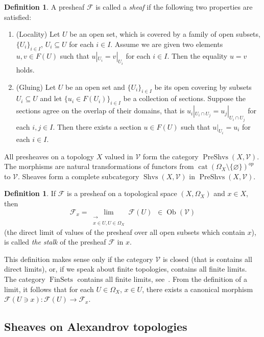 \documentclass[english,12pt,oneside]{amsproc}
\DeclareMathOperator{\cat}{cat}
\DeclareMathOperator{\FinSets}{FinSets}
\DeclareMathOperator{\PreShvs}{PreShvs}
\DeclareMathOperator{\Shvs}{Shvs}
\DeclareMathOperator{\Ob}{Ob}
\newcommand{\ca}[1]{\mathcal{#1}}
\newcommand{\Vv}{\mathcal{V}}
\newcounter{stmcounter}[section]
\numberwithin{equation}{section}
\theoremstyle{plain}
\theoremstyle{definition}
\newtheorem{defin}[stmcounter]{Definition}
\theoremstyle{remark}
\begin{document}
\begin{defin}\label{definSheaf}
A presheaf $\ca{F}$ is called a \emph{sheaf} if the following two properties are satisfied:
\begin{enumerate}
  \item (Locality) Let $U$ be an open set, which is covered by a family of open subsets, $\{U_{i}\}_{i\in I}$, $U_{i}\subseteq U$ for each $i\in I$. Assume we are given two elements $u,v\in F(U)$ such that $u|_{U_{i}}=v|_{U_{i}}$ for each $i\in I$. Then the equality $u=v$ holds.
  \item (Gluing) Let $U$ be an open set  and  $\{U_{i}\}_{i\in I}$ be its open covering by subsets $U_{i}\subseteq U$ and let $\{u_{i}\in F(U_{i})\}_{i\in I}$ be a collection of sections. Suppose the sections agree on the overlap of their domains, that is $u_{i}|_{U_{i}\cap U_{j}}=u_{j}|_{U_{i}\cap U_{j}}$ for each $i,j\in I$. Then there exists a section $u\in F(U)$ such that $u|_{U_{i}}=u_{i}$ for each $i\in I$.
\end{enumerate}
\end{defin}

All presheaves on a topology $X$ valued in $\Vv$ form the category $\PreShvs(X,\Vv)$. The morphisms are natural transformations of functors from $\cat(\Omega_X\setminus\{\varnothing\})^{op}$ to $\Vv$. Sheaves form a complete subcategory $\Shvs(X,\Vv)$ in $\PreShvs(X,\Vv)$.

\begin{defin}\label{defStalk}
If $\ca{F}$ is a presheaf on a topological space $(X,\Omega_X)$ and $x\in X$, then
\[
\ca{F}_x=\lim\limits_{\substack{\longrightarrow\\x\in U, U\in\Omega_X}}\ca{F}(U)\hspace{6pt}\in \Ob(\Vv)
\]
(the direct limit of values of the presheaf over all open subsets which contain $x$), is called \emph{the stalk} of the presheaf $\ca{F}$ in $x$.
\end{defin}

This definition makes sense only if the category $\Vv$ is closed (that is contains all direct limits), or, if we speak about finite topologies, contains all finite limits. The category $\FinSets$ contains all finite limits, see~\cite{Maklein}. From the definition of a limit, it follows that for each $U\in \Omega_X$, $x\in U$, there exists a canonical morphism $\ca{F}(U\ni x)\colon \ca{F}(U)\to \ca{F}_x$.

\subsection{Sheaves on Alexandrov topologies}\label{SAT}
\end{document}
